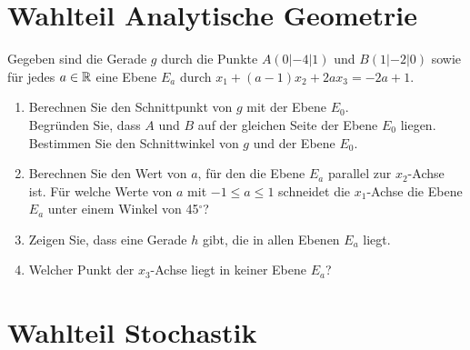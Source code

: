 \aufgabe{}

\section{Wahlteil Analytische Geometrie}

\aufgabe{}
Gegeben sind die Gerade $g$ durch die Punkte $A(0|-4|1)$ und $B(1|-2|0)$ sowie für jedes $a\in\mathbb{R}$ eine Ebene $E_a$ durch $x_1+(a-1)x_2+2ax_3=-2a+1$.
\begin{enumerate}
  \item Berechnen Sie den Schnittpunkt von $g$ mit der Ebene $E_0$.\\
  Begründen Sie, dass $A$ und $B$ auf der gleichen Seite der Ebene $E_0$ liegen.\\
  Bestimmen Sie den Schnittwinkel von $g$ und der Ebene $E_0$. 

  \item Berechnen Sie den Wert von $a$, für den die Ebene $E_a$ parallel zur $x_2$-Achse ist. Für welche Werte von $a$ mit $-1\leq a\leq 1$ schneidet die $x_1$-Achse die Ebene $E_a$ unter einem Winkel von 45$^\circ$? 

  \item Zeigen Sie, dass eine Gerade $h$ gibt, die in allen Ebenen $E_a$ liegt. 

  \item Welcher Punkt der $x_3$-Achse liegt in keiner Ebene $E_a$? 
\end{enumerate}

\aufgabe{}

\section{Wahlteil Stochastik}

\aufgabe{}

\aufgabe{}
\aufgabe{}
\aufgabe{}



